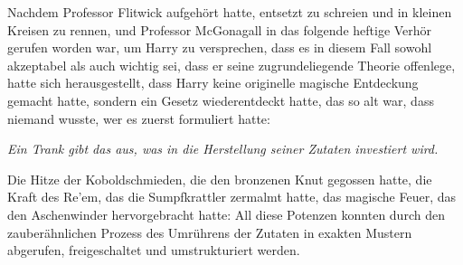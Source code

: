 Nachdem Professor Flitwick aufgehört hatte, entsetzt zu schreien und in kleinen Kreisen zu rennen, und Professor McGonagall in das folgende heftige Verhör gerufen worden war, um Harry zu versprechen, dass es in diesem Fall sowohl akzeptabel als auch wichtig sei, dass er seine zugrundeliegende Theorie offenlege, hatte sich herausgestellt, dass Harry keine originelle magische Entdeckung gemacht hatte, sondern ein Gesetz wiederentdeckt hatte, das so alt war, dass niemand wusste, wer es zuerst formuliert hatte:

\emph{Ein Trank gibt das aus, was in die Herstellung seiner Zutaten investiert wird.}

Die Hitze der Koboldschmieden, die den bronzenen Knut gegossen hatte, die Kraft des Re’em, das die Sumpfkrattler zermalmt hatte, das magische Feuer, das den Aschenwinder hervorgebracht hatte: All diese Potenzen konnten durch den zauberähnlichen Prozess des Umrührens der Zutaten in exakten Mustern abgerufen, freigeschaltet und umstrukturiert werden.


